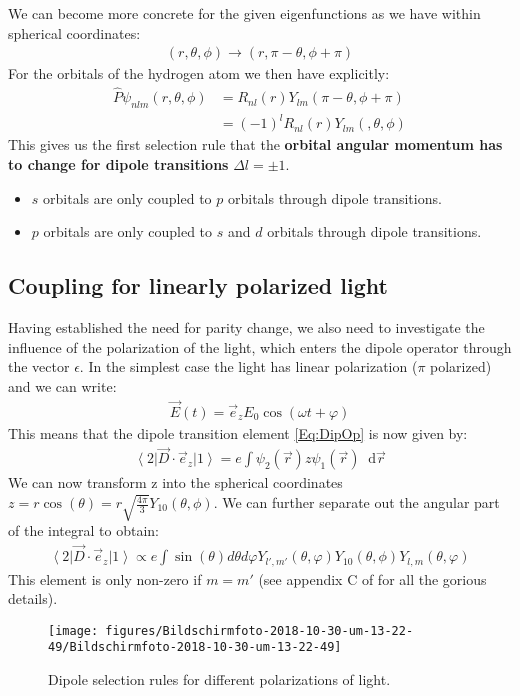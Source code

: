 \documentclass[10pt]{article}
\let\cite\citep
\providecommand\citep{\cite}
\newcommand{\bra}[1]{\ensuremath{\left\langle#1\right|}}
\newcommand{\ket}[1]{\ensuremath{\left|#1\right\rangle}}
\newcommand*\dif{\mathop{}\!\mathrm{d}}
\begin{document}
We can become more concrete for the given eigenfunctions as we have within spherical coordinates:
\begin{align}
(r, \theta, \phi) \rightarrow (r, \pi -\theta, \phi+\pi)
\end{align}
For the orbitals of the hydrogen atom we then have explicitly:
\begin{align}
\hat{P}\psi_{nlm}(r, \theta, \phi) &= R_{nl}(r)Y_{lm}(\pi -\theta, \phi+\pi)\\
&= (-1)^l R_{nl}(r)Y_{lm}(, \theta, \phi)
\end{align}
This gives us the first selection rule that the \textbf{orbital angular momentum has to change for dipole transitions} $\Delta  l = \pm 1$. 
\begin{itemize}
\item $s$ orbitals are only coupled to $p$ orbitals through dipole transitions.
\item $p$ orbitals are only coupled to $s$ and $d$ orbitals through dipole transitions.
\end{itemize}



\subsection{Coupling for linearly polarized light}
Having established the need for parity change, we also need to investigate the influence of the polarization of the light, which enters the dipole operator through the vector $\epsilon$. In the simplest case the light has linear polarization ($\pi$ polarized) and we can write:
\begin{align}
\vec{E}(t) = \vec{e}_zE_0 \cos(\omega t +\varphi)
\end{align}
This means that the dipole transition element \eqref{Eq:DipOp} is now given by:
\begin{align}
\bra{2}\vec{D}\cdot\vec{e}_z\ket{1} = e \int \psi_2(\vec{r}) z \psi_1\left(\vec{r}\right) \dif \vec{r}
\end{align}
We can now transform z into the spherical coordinates $z= r \cos(\theta) = r\sqrt{\frac{4\pi}{3}}Y_{10}(\theta, \phi)$. We can further separate out the angular part of the integral to obtain:
\begin{align}
\bra{2}\vec{D}\cdot\vec{e}_z\ket{1} \propto e \int \sin(\theta) d\theta d\varphi Y_{l',m'}(\theta, \varphi) Y_{10}(\theta, \phi) Y_{l,m}(\theta, \varphi)
\end{align}
This element is only non-zero if $m = m'$ (see appendix C of \cite{Hertel_2015} for all the gorious details).
\begin{figure}[h!]
\begin{center}
\texttt{[image: figures/Bildschirmfoto-2018-10-30-um-13-22-49/Bildschirmfoto-2018-10-30-um-13-22-49]}
\caption{{Dipole selection rules for different polarizations of light.
{\label{852353}}%
}}
\end{center}
\end{figure}
\end{document}
